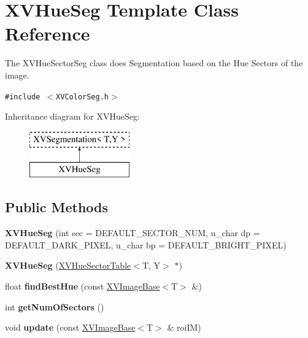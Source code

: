 \hypertarget{class_XVHueSeg}{
\section{XVHue\-Seg  Template Class Reference}
\label{XVHueSeg}
}
The XVHue\-Sector\-Seg class does Segmentation based on the Hue Sectors of the image. 


{\tt \#include $<$XVColor\-Seg.h$>$}

Inheritance diagram for XVHue\-Seg:\begin{figure}[H]
\begin{center}
\leavevmode
\includegraphics[height=2cm]{class_XVHueSeg}
\end{center}
\end{figure}
\subsection*{Public Methods}
\begin{CompactItemize}
\item 
\label{XVHueSeg_a0}
\hypertarget{class_XVHueSeg_a0}{
{\bf XVHue\-Seg} (int sec = DEFAULT\_\-SECTOR\_\-NUM, u\_\-char dp = DEFAULT\_\-DARK\_\-PIXEL, u\_\-char bp = DEFAULT\_\-BRIGHT\_\-PIXEL)}

\item 
\label{XVHueSeg_a1}
\hypertarget{class_XVHueSeg_a1}{
{\bf XVHue\-Seg} (\hyperlink{class_XVHueSectorTable}{XVHue\-Sector\-Table}$<$T, Y$>$ $\ast$)}

\item 
\label{XVHueSeg_a2}
\hypertarget{class_XVHueSeg_a2}{
float {\bf find\-Best\-Hue} (const \hyperlink{class_XVImageBase}{XVImage\-Base}$<$T$>$ \&)}

\item 
int {\bf get\-Num\-Of\-Sectors} ()
\item 
void {\bf update} (const \hyperlink{class_XVImageBase}{XVImage\-Base}$<$T$>$ \& roi\-IM)
\end{CompactItemize}
